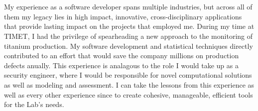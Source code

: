 \\\\
\indent My experience as a software developer spans multiple industries, but across all of them 
my legacy lies in high impact, innovative, cross-disciplinary applications that provide 
lasting impact on the projects that employed me. During my time at TIMET, I had the privilege 
of spearheading a new approach to the monitoring of titanium production. My software 
development and statistical techniques directly contributed to an effort that would save the 
company millions on production defects anually. This experience is analagous to the role I 
would take up as a security engineer, where I would be responsible for novel computational 
solutions as well as modeling and assessment. I can take the lessons from this 
experience as well as every other experience since to create cohesive, manageable, efficient 
tools for the Lab's needs.